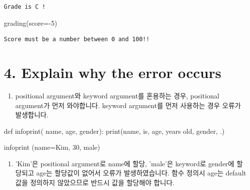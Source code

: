 \documentclass[
  a4paper,
  DIV=11,
  numbers=noendperiod]{scrreprt}
\newenvironment{Shaded}{\begin{snugshade}}{\end{snugshade}}
\newcommand{\BuiltInTok}[1]{\textcolor[rgb]{0.00,0.23,0.31}{#1}}
\newcommand{\DecValTok}[1]{\textcolor[rgb]{0.68,0.00,0.00}{#1}}
\newcommand{\KeywordTok}[1]{\textcolor[rgb]{0.00,0.23,0.31}{#1}}
\newcommand{\NormalTok}[1]{\textcolor[rgb]{0.00,0.23,0.31}{#1}}
\newcommand{\OperatorTok}[1]{\textcolor[rgb]{0.37,0.37,0.37}{#1}}
\newcommand{\StringTok}[1]{\textcolor[rgb]{0.13,0.47,0.30}{#1}}
\providecommand{\tightlist}{%
  \setlength{\itemsep}{0pt}\setlength{\parskip}{0pt}}\usepackage{longtable,booktabs,array}
\begin{document}
\begin{verbatim}
Grade is C !
\end{verbatim}

\begin{Shaded}
\begin{Highlighting}[]
\NormalTok{grading(score}\OperatorTok{={-}}\DecValTok{5}\NormalTok{)}
\end{Highlighting}
\end{Shaded}

\begin{verbatim}
Score must be a number between 0 and 100!!
\end{verbatim}

\section*{4. Explain why the error
occurs}\label{explain-why-the-error-occurs}


\begin{enumerate}
\def\labelenumi{(\arabic{enumi})}
\tightlist
\item
  positional argument와 keyword argument를 혼용하는 경우, positional
  argument가 먼저 와야합니다. keyword argument를 먼저 사용하는 경우
  오류가 발생합니다.
\end{enumerate}

\begin{Shaded}
\begin{Highlighting}[]
\KeywordTok{def}\NormalTok{ infoprint( name, age, gender):}
    \BuiltInTok{print}\NormalTok{(name, }\StringTok{\textquotesingle{}is\textquotesingle{}}\NormalTok{, age, }\StringTok{\textquotesingle{}years old\textquotesingle{}}\NormalTok{, gender, }\StringTok{\textquotesingle{}.\textquotesingle{}}\NormalTok{)}

\NormalTok{infoprint (name}\OperatorTok{=}\StringTok{\textquotesingle{}Kim\textquotesingle{}}\NormalTok{, }\DecValTok{30}\NormalTok{, }\StringTok{\textquotesingle{}male\textquotesingle{}}\NormalTok{)}
\end{Highlighting}
\end{Shaded}

\begin{enumerate}
\def\labelenumi{(\arabic{enumi})}
\setcounter{enumi}{1}
\tightlist
\item
  'Kim'은 positional argument로 name에 할당, 'male'은 keyword로 gender에
  할당되고 age는 할당값이 없어서 오류가 발생하였습니다. 함수 정의시
  age는 default값을 정의하지 않았으므로 반드시 값을 할당해야 합니다.
\end{enumerate}
\end{document}
